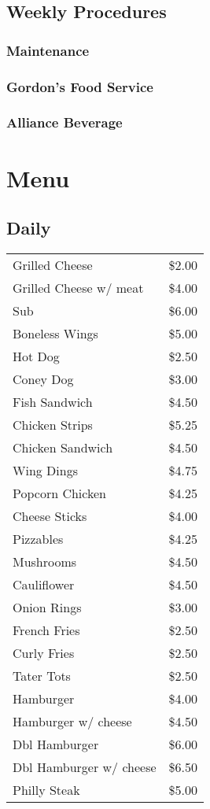 \documentclass[11pt]{article}
\begin{document}
\subsection{Weekly Procedures}
\label{sec-1-2}

\subsubsection{Maintenance}
\label{sec-1-2-1}

\subsubsection{Gordon's Food Service}
\label{sec-1-2-2}

\subsubsection{Alliance Beverage}
\label{sec-1-2-3}


\section{Menu}
\label{sec-2}
\subsection{Daily}
\label{sec-2-1}
\begin{center}
\begin{tabular}{ll}
\hline
Grilled Cheese & \$2.00\\
Grilled Cheese w/ meat & \$4.00\\
Sub & \$6.00\\
Boneless Wings & \$5.00\\
Hot Dog & \$2.50\\
Coney Dog & \$3.00\\
Fish Sandwich & \$4.50\\
Chicken Strips & \$5.25\\
Chicken Sandwich & \$4.50\\
Wing Dings & \$4.75\\
Popcorn Chicken & \$4.25\\
Cheese Sticks & \$4.00\\
Pizzables & \$4.25\\
Mushrooms & \$4.50\\
Cauliflower & \$4.50\\
Onion Rings & \$3.00\\
French Fries & \$2.50\\
Curly Fries & \$2.50\\
Tater Tots & \$2.50\\
Hamburger & \$4.00\\
Hamburger w/ cheese & \$4.50\\
Dbl Hamburger & \$6.00\\
Dbl Hamburger w/ cheese & \$6.50\\
Philly Steak & \$5.00\\
\hline
\end{tabular}
\end{center}
\end{document}
